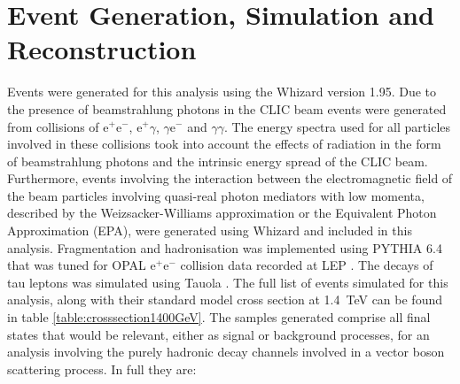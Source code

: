 
\section{Event Generation, Simulation and Reconstruction}
\label{sec:eventgenerationandbackgrounds}
Events were generated for this analysis using the Whizard \cite{0708.4233, hep-ph/0102195} version 1.95.  Due to the presence of beamstrahlung photons in the CLIC beam events were generated from collisions of $\text{e}^{+}\text{e}^{-}$, $\text{e}^{+}\gamma$, $\gamma\text{e}^{-}$ and $\gamma\gamma$.  The energy spectra used for all particles involved in these collisions took into account the effects of radiation in the form of beamstrahlung photons and the intrinsic energy spread of the CLIC beam.  Furthermore, events involving the interaction between the electromagnetic field of the beam particles involving quasi-real photon mediators with low momenta, described by the Weizsacker-Williams approximation or the Equivalent Photon Approximation (EPA), were generated using Whizard and included in this analysis.  Fragmentation and hadronisation was implemented using PYTHIA 6.4 \cite{Sjostrand:2006za} that was tuned for OPAL $\text{e}^{+}\text{e}^{-}$ collision data recorded at LEP \cite{Linssen:2012hp}.  The decays of tau leptons was simulated using Tauola \cite{Was:2000st}.  The full list of events simulated for this analysis, along with their standard model cross section at 1.4~TeV can be found in table \ref{table:crosssection1400GeV}.  The samples generated comprise all final states that would be relevant, either as signal or background processes, for an analysis involving the purely hadronic decay channels involved in a vector boson scattering process.  In full they are:

